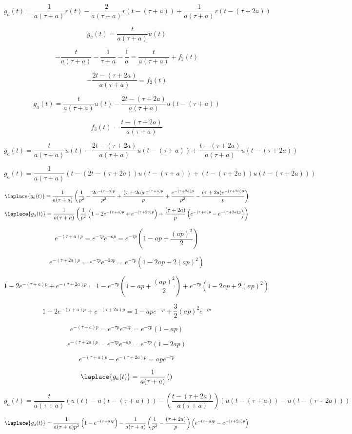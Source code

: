 \[
    g_a(t)=\dfrac{1}{a(\tau+a)}r(t)-\dfrac{2}{a(\tau+a)}r(t-(\tau+a))+\dfrac{1}{a(\tau+a)}r(t-(\tau+2a))
\]

\[
    g_a(t)=\dfrac{t}{a(\tau+a)}u(t)
\]

\[
    -\dfrac{t}{a(\tau+a)}-\dfrac{1}{\tau+a}-\dfrac{1}{a}=\dfrac{t}{a(\tau+a)}+f_2(t)
\]

\[
    -\dfrac{2t-(\tau+2a)}{a(\tau+a)}=f_2(t)
\]

\[
    g_a(t)=\dfrac{t}{a(\tau+a)}u(t)-\dfrac{2t-(\tau+2a)}{a(\tau+a)}u(t-(\tau+a))
\]

\[
    f_3(t)=\dfrac{t-(\tau+2a)}{a(\tau+a)}
\]

\[
    g_a(t)=\dfrac{t}{a(\tau+a)}u(t)-\dfrac{2t-(\tau+2a)}{a(\tau+a)}u(t-(\tau+a))+\dfrac{t-(\tau+2a)}{a(\tau+a)}u(t-(\tau+2a))
\]

\[
    g_a(t)=\dfrac{1}{a(\tau+a)}\left(t-(2t-(\tau+2a))u(t-(\tau+a))+(t-(\tau+2a))u(t-(\tau+2a))\right)
\]

\footnotesize
\[
    \laplace{g_a(t)}=\dfrac{1}{a(\tau+a)}\left(   \dfrac{1}{p^2}-\dfrac{2e^{-(\tau+a)p}}{p^2}+\dfrac{(\tau+2a)e^{-(\tau+a)p}}{p}
                                                + \dfrac{e^{-(\tau+2a)p}}{p^2} - \dfrac{(\tau+2a)e^{-(\tau+2a)p}}{p} \right)
\]
\[
     \laplace{g_a(t)}=\dfrac{1}{a(\tau+a)}\left( \dfrac{1}{p^2}\left(1-2e^{-(\tau+a)p}+e^{-(\tau+2a)p}\right) 
                                           + \dfrac{(\tau+2a)}{p}\left(e^{-(\tau+a)p}-e^{-(\tau+2a)p} \right) \right)
\]


\[
    e^{-(\tau+a)p}=e^{-\tau p}e^{-ap}=e^{-\tau p}\left(1-ap+\dfrac{(ap)^2}{2}\right)
\]

\[
    e^{-(\tau+2a)p}=e^{-\tau p}e^{-2ap}=e^{-\tau p}\left(1-2ap+2(ap)^2\right)
\]

\[
    1-2e^{-(\tau+a)p}+e^{-(\tau+2a)p}=1-e^{-\tau p}\left(1-ap+\dfrac{(ap)^2}{2}\right)+e^{-\tau p}\left(1-2ap+2(ap)^2\right)
\]

\[
    1-2e^{-(\tau+a)p}+e^{-(\tau+2a)p}=1-ape^{-\tau p}+\dfrac{3}{2}(ap)^2e^{-\tau p}
\]

\[
    e^{-(\tau+a)p}=e^{-\tau p}e^{-ap}=e^{-\tau p}\left(1-ap\right)
\]

\[
    e^{-(\tau+2a)p}=e^{-\tau p}e^{-ap}=e^{-\tau p}\left(1-2ap\right)
\]

\[
    e^{-(\tau+a)p}-e^{-(\tau+2a)p}=ape^{-\tau p}
\]

\[
    \laplace{g_a(t)}=\dfrac{1}{a(\tau+a)}\left(\right)
\]


\[
    g_a(t)=\dfrac{t}{a(\tau+a)}\left(u(t)-u(t-(\tau+a))\right) - \left(\dfrac{t-(\tau+2a)}{a(\tau+a)}\right)\left(u(t-(\tau+a))-u(t-(\tau+2a))\right)
\]

\[
    \laplace{g_a(t)}=\dfrac{1}{a(\tau+a)p^2}\left(1-e^{-(\tau+a)p}\right) - \dfrac{1}{a(\tau+a)}\left(\dfrac{1}{p^2}-\dfrac{(\tau+2a)}{p}\right)\left(e^{-(\tau+a)p}-e^{-(\tau+2a)p}\right)
\]
